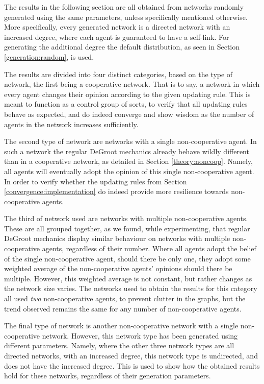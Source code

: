 \documentclass[a4paper, 12pt]{report}
\begin{document}
The results in the following section are all obtained from networks randomly generated using the same parameters, unless specifically mentioned otherwise. More specifically, every generated network is a directed network with an increased degree, where each agent is guaranteed to have a self-link. For generating the additional degree the default distribution, as seen in Section \ref{generation:random}, is used.

\noindent The results are divided into four distinct categories, based on the type of network, the first being a cooperative network. That is to say, a network in which every agent changes their opinion according to the given updating rule. This is meant to function as a control group of sorts, to verify that all updating rules behave as expected, and do indeed converge and show wisdom as the number of agents in the network increases sufficiently.

\noindent The second type of network are networks with a single non-cooperative agent. In such a network the regular DeGroot mechanics already behave wildly different than in a cooperative network, as detailed in Section \ref{theory:noncoop}. Namely, all agents will eventually adopt the opinion of this single non-cooperative agent. In order to verify whether the updating rules from Section \ref{convergence:implementation} do indeed provide more resilience towards non-cooperative agents.

\noindent The third of network used are networks with multiple non-cooperative agents. These are all grouped together, as we found, while experimenting, that regular DeGroot mechanics display similar behaviour on networks with multiple non-cooperative agents, regardless of their number. Where all agents adopt the belief of the single non-cooperative agent, should there be only one, they adopt some weighted average of the non-cooperative agents' opinions should there be multiple. However, this weighted average is not constant, but rather changes as the network size varies. The networks used to obtain the results for this category all used \emph{two} non-cooperative agents, to prevent clutter in the graphs, but the trend observed remains the same for any number of non-cooperative agents.

\noindent The final type of network is another non-cooperative network with a single non-cooperative network. However, this network type has been generated using different parameters. Namely, where the other three network types are all directed networks, with an increased degree, this network type is undirected, and does not have the increased degree. This is used to show how the obtained results hold for these networks, regardless of their generation parameters.
\end{document}
